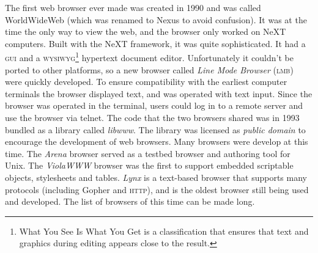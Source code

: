 \documentclass[a4paper,11pt]{kth-mag}
\begin{document}
        The first web browser ever made was created in 1990 and was called WorldWideWeb (which was renamed to Nexus to avoid confusion).
        It was at the time the only way to view the web, and the browser only worked on NeXT computers.
        Built with the NeXT framework, it was quite sophisticated.
        It had a \textsc{gui} and a \textsc{wysiwyg}\footnote{What You See Is What You Get is a classification that ensures that text and graphics during editing appears close to the result.} hypertext document editor.
        Unfortunately it couldn't be ported to other platforms, so a new browser called \emph{Line Mode Browser} (\textsc{lmb}) were quickly developed.
        To ensure compatibility with the earliest computer terminals the browser displayed text, and was operated with text input.
        Since the browser was operated in the terminal, users could log in to a remote server and use the browser via telnet.
        The code that the two browsers shared was in 1993 bundled as a library called \emph{libwww}.
        The library was licensed as \emph{public domain} to encourage the development of web browsers.
        Many browsers were develop at this time.
        The \emph{Arena} browser served as a testbed browser and authoring tool for Unix.
        The \emph{ViolaWWW} browser was the first to support embedded scriptable objects, stylesheets and tables.
        \emph{Lynx} is a text-based browser that supports many protocols (including Gopher and \textsc{http}), and is the oldest browser still being used and developed.
        The list of browsers of this time can be made long.
\end{document}
